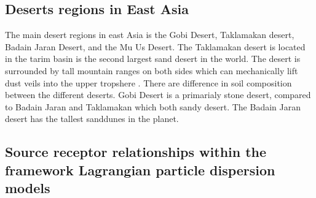 \subsection{Deserts regions in East Asia}
The main desert regions in east Asia is the Gobi Desert, Taklamakan desert, Badain Jaran Desert,  and the Mu Us Desert. The Taklamakan desert is located in the tarim basin is the second largest sand desert in the world. The desert is surrounded by tall mountain ranges on both sides which can mechanically lift dust veils into the upper tropshere \parencite{yumimoto_elevated_2009}.   There are difference in soil composition between the different deserts. Gobi Desert is a primarialy stone desert, compared to Badain Jaran and Taklamakan which both sandy desert. The Badain Jaran desert has the tallest sanddunes in the planet. 





\subsection{Source receptor relationships within the framework Lagrangian particle dispersion models}

